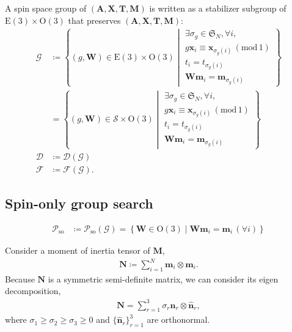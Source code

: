 \documentclass[a4paper, 11pt]{article}
\theoremstyle{definition}
\newcommand{\relmiddle}[1]{\mathrel{}\middle#1\mathrel{}}
\newcommand{\set}[2]{\left\{ #1 \relmiddle| #2 \right\}}
\begin{document}
A spin space group of $(\bm{A}, \bm{X}, \bm{T}, \bm{M})$ is written as a stabilizer subgroup of $\mathrm{E}(3) \times \mathrm{O}(3)$ that preserves $(\bm{A}, \bm{X}, \bm{T}, \bm{M})$:
\begin{align}
  \mathcal{G}
    &\coloneqq \set{
      (g, \bm{W}) \in \mathrm{E}(3) \times \mathrm{O}(3)
    }{
        \begin{array}{l}
          \exists \sigma_{g} \in \mathfrak{S}_{N}, \forall i, \\
          g \bm{x}_{i} \equiv \bm{x}_{\sigma_{g}(i)} \, (\mathrm{mod} \, 1) \\
          t_{i} = t_{\sigma_{g}(i)} \\
          \bm{W} \bm{m}_{i} = \bm{m}_{\sigma_{g}(i)}
        \end{array}
    } \\
    &= \set{
      (g, \bm{W}) \in \mathcal{S} \times \mathrm{O}(3)
    }{
        \begin{array}{l}
          \exists \sigma_{g} \in \mathfrak{S}_{N}, \forall i, \\
          g \bm{x}_{i} \equiv \bm{x}_{\sigma_{g}(i)} \, (\mathrm{mod} \, 1) \\
          t_{i} = t_{\sigma_{g}(i)} \\
          \bm{W} \bm{m}_{i} = \bm{m}_{\sigma_{g}(i)}
        \end{array}
    } \\
  \mathcal{D} &\coloneqq \mathcal{D}(\mathcal{G}) \\
  \mathcal{F} &\coloneqq \mathcal{F}(\mathcal{G}).
\end{align}

\subsection{Spin-only group search}

\begin{align}
  \mathcal{P}_{\mathrm{so}}
    &\coloneqq \mathcal{P}_{\mathrm{so}}(\mathcal{G})
    = \set{
        \bm{W} \in \mathrm{O}(3)
      }{
        \bm{W} \bm{m}_{i} = \bm{m}_{i} \,(\forall i)
      }
\end{align}

Consider a moment of inertia tensor of $\bm{M}$,
\begin{align}
  \bm{N} \coloneqq \sum_{i=1}^{N} \bm{m}_{i} \otimes \bm{m}_{i}.
\end{align}
Because $\bm{N}$ is a symmetric semi-definite matrix, we can consider its eigen decomposition,
\begin{align}
  \bm{N} = \sum_{r=1}^{3} \sigma_{r} \hat{\bm{n}}_{r} \otimes \hat{\bm{n}}_{r},
\end{align}
where $\sigma_{1} \geq \sigma_{2} \geq \sigma_{3} \geq 0$ and $\{ \hat{\bm{n}}_{r} \}_{r=1}^{3}$ are orthonormal.
\end{document}
